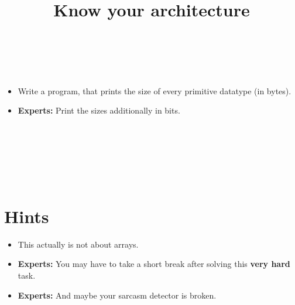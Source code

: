 


\title{Know your architecture} %
\author{} %
\renewcommand{\difficulty}{Easy} %
\renewcommand{\requirements}{Basic C functionality} %
\renewcommand{\aims}{Know your architecture} %


 \maketitle
 \taskinfos

\ \\\ \\
\begin{itemize}
	\item Write a program, that prints the size of every primitive datatype (in bytes).
	\item \textbf{Experts:} Print the sizes additionally in bits.
\end{itemize}	
 
 
\ \\\ \\\ \\\ \\\ \\
\section*{Hints}
	\begin{itemize}
		\item This actually is not about arrays.
		\item \textbf{Experts:} You may have to take a short break after solving this \textbf{very hard} task.
		\item \textbf{Experts:} And maybe your sarcasm detector is broken.
	\end{itemize}
 

